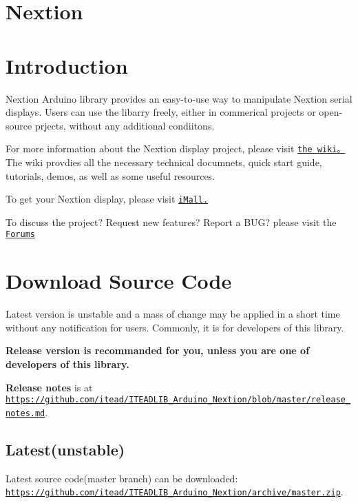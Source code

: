 \section*{Nextion}





\section*{Introduction}

Nextion Arduino library provides an easy-\/to-\/use way to manipulate Nextion serial displays. Users can use the libarry freely, either in commerical projects or open-\/source prjects, without any additional condiitons.

For more information about the Nextion display project, please visit \href{http://wiki.iteadstudio.com/Nextion_HMI_Solution}{\tt the wiki。} The wiki provdies all the necessary technical documnets, quick start guide, tutorials, demos, as well as some useful resources.

To get your Nextion display, please visit \href{http://imall.itead.cc/display/nextion.html}{\tt i\+Mall.}

To discuss the project? Request new features? Report a B\+U\+G? please visit the \href{http://support.iteadstudio.com/discussions/1000058038}{\tt Forums}

\section*{Download Source Code}

Latest version is unstable and a mass of change may be applied in a short time without any notification for users. Commonly, it is for developers of this library.

{\bfseries Release version is recommanded for you, unless you are one of developers of this library.}

{\bfseries Release notes} is at \href{https://github.com/itead/ITEADLIB_Arduino_Nextion/blob/master/release_notes.md}{\tt https\+://github.\+com/itead/\+I\+T\+E\+A\+D\+L\+I\+B\+\_\+\+Arduino\+\_\+\+Nextion/blob/master/release\+\_\+notes.\+md}.

\subsection*{Latest(unstable)}

Latest source code(master branch) can be downloaded\+: \href{https://github.com/itead/ITEADLIB_Arduino_Nextion/archive/master.zip}{\tt https\+://github.\+com/itead/\+I\+T\+E\+A\+D\+L\+I\+B\+\_\+\+Arduino\+\_\+\+Nextion/archive/master.\+zip}.

